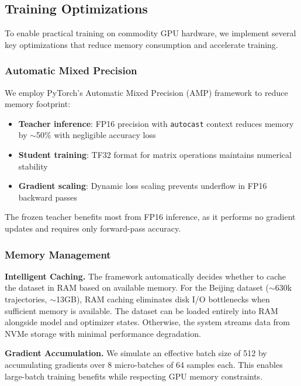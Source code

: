 \subsection{Training Optimizations}
\label{sec:impl-opt}

To enable practical training on commodity GPU hardware, we implement several key optimizations that reduce memory consumption and accelerate training.

\subsubsection{Automatic Mixed Precision}

We employ PyTorch's Automatic Mixed Precision (AMP) framework to reduce memory footprint:

\begin{itemize}[noitemsep,topsep=0pt]
    \item \textbf{Teacher inference}: FP16 precision with \texttt{autocast} context reduces memory by $\sim$50\% with negligible accuracy loss
    \item \textbf{Student training}: TF32 format for matrix operations maintains numerical stability
    \item \textbf{Gradient scaling}: Dynamic loss scaling prevents underflow in FP16 backward passes
\end{itemize}

The frozen teacher benefits most from FP16 inference, as it performs no gradient updates and requires only forward-pass accuracy.

\subsubsection{Memory Management}

\textbf{Intelligent Caching.} The framework automatically decides whether to cache the dataset in RAM based on available memory. For the Beijing dataset ($\sim$630k trajectories, $\sim$13GB), RAM caching eliminates disk I/O bottlenecks when sufficient memory is available. The dataset can be loaded entirely into RAM alongside model and optimizer states. Otherwise, the system streams data from NVMe storage with minimal performance degradation.

\textbf{Gradient Accumulation.} We simulate an effective batch size of 512 by accumulating gradients over 8 micro-batches of 64 samples each. This enables large-batch training benefits while respecting GPU memory constraints.

